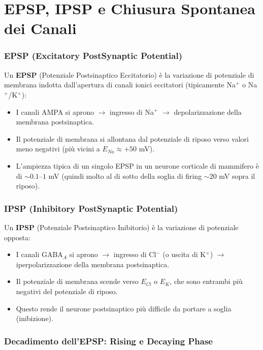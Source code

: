 \section{EPSP, IPSP e Chiusura Spontanea dei Canali}

\subsubsection{EPSP (Excitatory PostSynaptic Potential)}

Un \textbf{EPSP} (Potenziale Postsinaptico Eccitatorio) è la variazione di potenziale di membrana indotta dall'apertura di canali ionici eccitatori (tipicamente Na$^+$ o Na$^+$/K$^+$):

\begin{itemize}
    \item I canali AMPA si aprono $\rightarrow$ ingresso di Na$^+$ $\rightarrow$ depolarizzazione della membrana postsinaptica.
    \item Il potenziale di membrana si allontana dal potenziale di riposo verso valori meno negativi (più vicini a $E_{Na} \approx +50$ mV).
    \item L'ampiezza tipica di un singolo EPSP in un neurone corticale di mammifero è di $\sim 0.1$–$1$ mV (quindi molto al di sotto della soglia di firing $\sim 20$ mV sopra il riposo).
\end{itemize}

\subsubsection{IPSP (Inhibitory PostSynaptic Potential)}

Un \textbf{IPSP} (Potenziale Postsinaptico Inibitorio) è la variazione di potenziale opposta:

\begin{itemize}
    \item I canali GABA$_A$ si aprono $\rightarrow$ ingresso di Cl$^-$ (o uscita di K$^+$) $\rightarrow$ iperpolarizzazione della membrana postsinaptica.
    \item Il potenziale di membrana scende verso $E_{Cl}$ o $E_K$, che sono entrambi più negativi del potenziale di riposo.
    \item Questo rende il neurone postsinaptico più difficile da portare a soglia (inibizione).
\end{itemize}

\subsubsection{Decadimento dell'EPSP: Rising e Decaying Phase}

